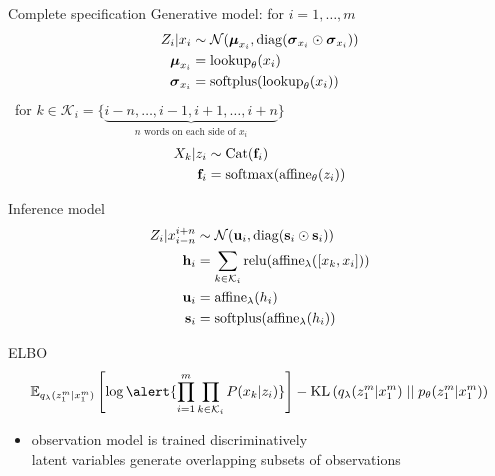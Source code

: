 \begin{frame}[plain]{Complete specification}
Generative model: for $i=1, \ldots, m$\\

\begin{equation*}
\begin{aligned}
Z_i|x_i &\sim \mathcal N(\boldsymbol \mu_{x_i}, \operatorname{diag}(\boldsymbol \sigma_{x_i} \odot \boldsymbol \sigma_{x_i}))\\
\boldsymbol \mu_{x_i} &= \text{lookup}_\theta(x_i)\\
\boldsymbol \sigma_{x_i} &= \operatorname{softplus}(\text{lookup}_\theta(x_i))
\end{aligned}
\end{equation*}
\pause
~for $k \in \mathcal K_i = \{\underbrace{i-n, \ldots, i-1,  i+1, \ldots, i+n}_{n \text{ words on each side of }x_i}\}$ \pause
\begin{equation*}
\begin{aligned}
X_k|z_i &\sim \operatorname{Cat}(\mathbf f_i) \\ 
\mathbf f_i &= \operatorname{softmax}(\operatorname{affine}_\theta(z_i))
\end{aligned}
\end{equation*}

\pause

Inference model
\begin{equation*}
\begin{aligned}
Z_i|x_{i-n}^{i+n} &\sim \mathcal N(\mathbf u_i, \operatorname{diag}(\mathbf s_i \odot \mathbf s_i))\\
\mathbf h_i &= \sum_{k \in \mathcal K_i} \operatorname{relu}(\operatorname{affine}_\lambda([x_k, x_i])) \\
\mathbf u_i &= \operatorname{affine}_\lambda(h_i) \\
\mathbf s_i &= \operatorname{softplus}(\operatorname{affine}_\lambda(h_i)) 
\end{aligned}
\end{equation*}


\end{frame}

\begin{frame}{ELBO}
\begin{equation*}
\begin{aligned}
\mathbb E_{q_\lambda(z_1^m|x_1^m)} \left[ \log \alert{\prod_{i=1}^m \prod_{k \in \mathcal K_i} P(x_k|z_i)} \right] - \KL{q_\lambda(z_1^m|x_1^m)}{p_\theta(z_1^m|x_1^m)}
\end{aligned}
\end{equation*}
\begin{itemize}
	\item observation model is trained discriminatively\\
	latent variables generate overlapping subsets of observations
\end{itemize}

\end{frame}

